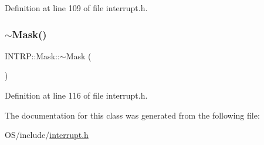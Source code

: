 Definition at line 109 of file interrupt.\+h.

\mbox{\label{class_i_n_t_r_p_1_1_mask_a9510ca576c94618168e76d14521c3e6d}} 
\subsubsection{\texorpdfstring{$\sim$\+Mask()}{~Mask()}}
{\footnotesize\ttfamily I\+N\+T\+R\+P\+::\+Mask\+::$\sim$\+Mask (\begin{DoxyParamCaption}{ }\end{DoxyParamCaption})\hspace{0.3cm}{\ttfamily [inline]}}



Definition at line 116 of file interrupt.\+h.



The documentation for this class was generated from the following file\+:\begin{DoxyCompactItemize}
\item 
O\+S/include/\hyperlink{interrupt_8h}{interrupt.\+h}\end{DoxyCompactItemize}
